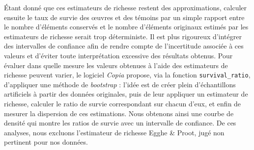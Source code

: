 \documentclass[a4paper,twoside,12pt]{book}
\begin{document}
Étant donné que ces estimateurs de richesse restent des approximations, calculer ensuite le taux de survie des œuvres et des témoins par un simple rapport entre le nombre d’éléments conservés et le nombre d’éléments originaux estimés par les estimateurs de richesse serait trop déterministe. Il est plus rigoureux d’intégrer des intervalles de confiance afin de rendre compte de l’incertitude associée à ces valeurs et d’éviter toute interprétation excessive des résultats obtenus. 
Pour évaluer dans quelle mesure les valeurs obtenues à l’aide des estimateurs de richesse peuvent varier, le logiciel \textit{Copia} propose, via la fonction \texttt{survival\_ratio}, d’appliquer une méthode de \textit{bootstrap} : l'idée est de créer plein d’échantillons artificiels à partir des données originales, puis de leur appliquer un estimateur de richesse, calculer le ratio de survie correspondant sur chacun d’eux, et enfin de mesurer la dispersion de ces estimations. Nous obtenons ainsi une courbe de densité qui montre les ratios de survie avec un intervalle de confiance. De ces analyses, nous excluons l'estimateur de richesse Egghe \& Proot, jugé non pertinent pour nos données. 
\end{document}
